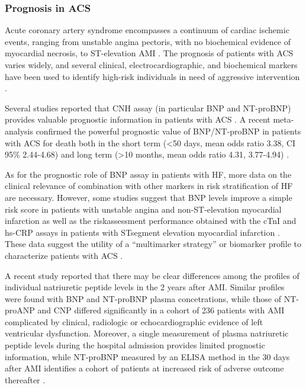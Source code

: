\documentclass[14pt,a4paper,onecolumn]{extarticle}
\begin{document}
\subsubsection{ Prognosis in ACS}

Acute coronary artery syndrome encompasses a continuum of cardiac ischemic events,
ranging from unstable angina pectoris, with no biochemical evidence of myocardial
necrosis, to ST-elevation AMI \citep{bib3221} \citep{bib3222}. The prognosis of patients with ACS varies
widely, and several clinical, electrocardiographic, and biochemical markers have been
used to identify high-risk individuals in need of aggressive intervention \citep{bib3222}.

Several studies reported that CNH assay (in particular BNP and NT-proBNP) provides valuable prognostic information in patients with ACS \citep{bib3117} \citep{bib3138} \citep{bib3223} \citep{bib3224} \citep{bib3225} \citep{bib3226} \citep{bib3227} \citep{bib3228} \citep{bib3229} \citep{bib3230} \citep{bib3231}. A recent
meta-analysis confirmed the powerful prognostic value of BNP/NT-proBNP in patients
with ACS for death both in the short term (<50 days, mean odds ratio 3.38, CI 95\% 2.44-4.68) and long term (>10 months, mean odds ratio 4.31, 3.77-4.94) \citep{bib376}.

As for the prognostic role of BNP assay in patients with HF, more data on the clinical
relevance of combination with other markers in risk stratification of HF are necessary.
However, some studies suggest that BNP levels improve a simple risk score in patients with
unstable angina and non-ST-elevation myocardial infarction \citep{bib3239} as well as the riskassessment performance obtained with the cTnI and hs-CRP assays in patients with STsegment elevation myocardial infarction \citep{bib3234}. These data suggest the utility of a “multimarker strategy” or biomarker profile to characterize patients with ACS \citep{bib378}.

A recent study \citep{bib3240} reported that there may be clear differences among the profiles of individual natriuretic peptide levels in the 2 years after AMI. Similar profiles
were found with BNP and NT-proBNP plasma concetrations, while those of NT-proANP
and CNP differed significantly in a cohort of 236 patients with AMI complicated by
clinical, radiologic or echocardiographic evidence of left ventricular dysfunction. Moreover, a single measurement of plasma natriuretic peptide levels during the hospital
admission provides limited prognostic information, while NT-proBNP measured by an
ELISA method in the 30 days after AMI identifies a cohort of patients at increased risk
of adverse outcome thereafter \citep{bib3240}.
\end{document}
